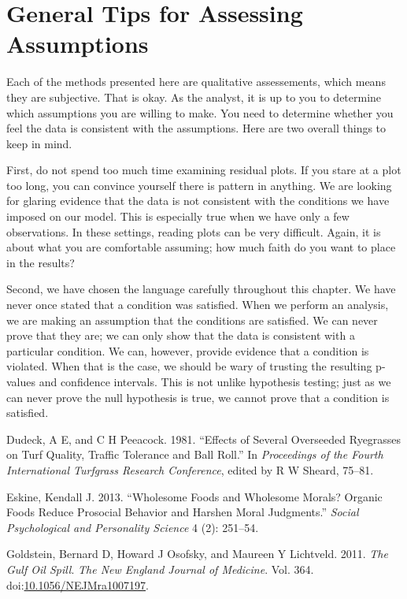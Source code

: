 \documentclass[]{book}
\theoremstyle{definition}
\theoremstyle{definition}
\theoremstyle{remark}
\begin{document}
\section{General Tips for Assessing
Assumptions}\label{general-tips-for-assessing-assumptions}

Each of the methods presented here are qualitative assessements, which
means they are subjective. That is okay. As the analyst, it is up to you
to determine which assumptions you are willing to make. You need to
determine whether you feel the data is consistent with the assumptions.
Here are two overall things to keep in mind.

First, do not spend too much time examining residual plots. If you stare
at a plot too long, you can convince yourself there is pattern in
anything. We are looking for glaring evidence that the data is not
consistent with the conditions we have imposed on our model. This is
especially true when we have only a few observations. In these settings,
reading plots can be very difficult. Again, it is about what you are
comfortable assuming; how much faith do you want to place in the
results?

Second, we have chosen the language carefully throughout this chapter.
We have never once stated that a condition was satisfied. When we
perform an analysis, we are making an assumption that the conditions are
satisfied. We can never prove that they are; we can only show that the
data is consistent with a particular condition. We can, however, provide
evidence that a condition is violated. When that is the case, we should
be wary of trusting the resulting p-values and confidence intervals.
This is not unlike hypothesis testing; just as we can never prove the
null hypothesis is true, we cannot prove that a condition is satisfied.

\hypertarget{refs}{}
\hypertarget{ref-Dudeck1981}{}
Dudeck, A E, and C H Peeacock. 1981. ``Effects of Several Overseeded
Ryegrasses on Turf Quality, Traffic Tolerance and Ball Roll.'' In
\emph{Proceedings of the Fourth International Turfgrass Research
Conference}, edited by R W Sheard, 75--81.

\hypertarget{ref-Eskine2013}{}
Eskine, Kendall J. 2013. ``Wholesome Foods and Wholesome Morals? Organic
Foods Reduce Prosocial Behavior and Harshen Moral Judgments.''
\emph{Social Psychological and Personality Science} 4 (2): 251--54.

\hypertarget{ref-Goldstein2011}{}
Goldstein, Bernard D, Howard J Osofsky, and Maureen Y Lichtveld. 2011.
\emph{The Gulf Oil Spill}. \emph{The New England Journal of Medicine}.
Vol. 364.
doi:\href{https://doi.org/10.1056/NEJMra1007197}{10.1056/NEJMra1007197}.
\end{document}
